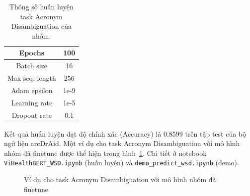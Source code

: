 \begin{table}
\centering
\begin{tabular}{|c|c|}
\hline
Epochs & 100 \\ \hline
Batch size & 16 \\ \hline
Max seq. length & 256 \\ \hline
Adam epsilon & 1e-9 \\ \hline
Learning rate & 1e-5 \\ \hline
Dropout rate & 0.1 \\ \hline
\end{tabular}
\caption{Thông số huấn luyện task Acronym Disambiguation của nhóm.}
\label{tab:experiments-self-ad}
\end{table}
Kết quả huấn luyện đạt độ chính xác (Accuracy) là 0.8599 trên tập test của bộ ngữ liệu arcDrAid. Một ví dụ cho task Acronym Disambiguation với mô hình nhóm đã finetune được thể hiện trong hình~\ref{fig:demo-wsd-output}. Chi tiết ở notebook \texttt{ViHealthBERT\_WSD.ipynb} (huấn luyện) và \texttt{demo\_predict\_wsd.ipynb} (demo).

\begin{figure}
\centering
{}
\caption{Ví dụ cho task Acronym Disambiguation với mô hình nhóm đã finetune}
\label{fig:demo-wsd-output}
\end{figure}